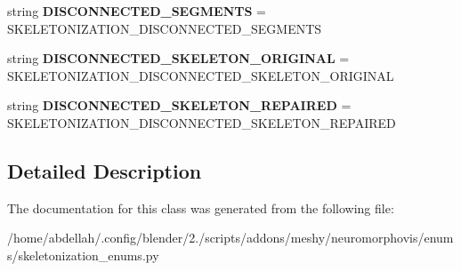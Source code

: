\begin{DoxyCompactItemize}
\item 
string {\bfseries D\+I\+S\+C\+O\+N\+N\+E\+C\+T\+E\+D\+\_\+\+S\+E\+G\+M\+E\+N\+TS} = \textquotesingle{}S\+K\+E\+L\+E\+T\+O\+N\+I\+Z\+A\+T\+I\+O\+N\+\_\+\+D\+I\+S\+C\+O\+N\+N\+E\+C\+T\+E\+D\+\_\+\+S\+E\+G\+M\+E\+N\+TS\textquotesingle{}\hypertarget{classmeshy_1_1neuromorphovis_1_1enums_1_1skeletonization__enums_1_1Skeletonization_1_1Method_aea388351f76fb20af3d2605bdc9dbeb8}{}\label{classmeshy_1_1neuromorphovis_1_1enums_1_1skeletonization__enums_1_1Skeletonization_1_1Method_aea388351f76fb20af3d2605bdc9dbeb8}

\item 
string {\bfseries D\+I\+S\+C\+O\+N\+N\+E\+C\+T\+E\+D\+\_\+\+S\+K\+E\+L\+E\+T\+O\+N\+\_\+\+O\+R\+I\+G\+I\+N\+AL} = \textquotesingle{}S\+K\+E\+L\+E\+T\+O\+N\+I\+Z\+A\+T\+I\+O\+N\+\_\+\+D\+I\+S\+C\+O\+N\+N\+E\+C\+T\+E\+D\+\_\+\+S\+K\+E\+L\+E\+T\+O\+N\+\_\+\+O\+R\+I\+G\+I\+N\+AL\textquotesingle{}\hypertarget{classmeshy_1_1neuromorphovis_1_1enums_1_1skeletonization__enums_1_1Skeletonization_1_1Method_a1e119c7736251d938a79a16d5435b0a4}{}\label{classmeshy_1_1neuromorphovis_1_1enums_1_1skeletonization__enums_1_1Skeletonization_1_1Method_a1e119c7736251d938a79a16d5435b0a4}

\item 
string {\bfseries D\+I\+S\+C\+O\+N\+N\+E\+C\+T\+E\+D\+\_\+\+S\+K\+E\+L\+E\+T\+O\+N\+\_\+\+R\+E\+P\+A\+I\+R\+ED} = \textquotesingle{}S\+K\+E\+L\+E\+T\+O\+N\+I\+Z\+A\+T\+I\+O\+N\+\_\+\+D\+I\+S\+C\+O\+N\+N\+E\+C\+T\+E\+D\+\_\+\+S\+K\+E\+L\+E\+T\+O\+N\+\_\+\+R\+E\+P\+A\+I\+R\+ED\textquotesingle{}\hypertarget{classmeshy_1_1neuromorphovis_1_1enums_1_1skeletonization__enums_1_1Skeletonization_1_1Method_ac45499b31f09a774ab9bdb0004144997}{}\label{classmeshy_1_1neuromorphovis_1_1enums_1_1skeletonization__enums_1_1Skeletonization_1_1Method_ac45499b31f09a774ab9bdb0004144997}

\end{DoxyCompactItemize}


\subsection{Detailed Description}


The documentation for this class was generated from the following file\+:\begin{DoxyCompactItemize}
\item 
/home/abdellah/.\+config/blender/2./scripts/addons/meshy/neuromorphovis/enums/skeletonization\+\_\+enums.\+py\end{DoxyCompactItemize}
